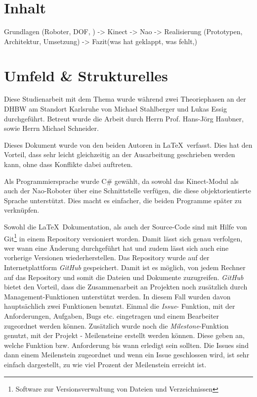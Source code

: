 \section{Inhalt}
Grundlagen (Roboter, DOF, ) -> Kinect -> Nao -> Realisierung (Prototypen, Architektur, Umsetzung) -> Fazit(was hat geklappt, was fehlt,)



\section{Umfeld \& Strukturelles}
Diese Studienarbeit mit dem Thema \textit{\Titel} wurde während zwei Theoriephasen an der \ac{DHBW} am Standort Karlsruhe von Michael Stahlberger und Lukas Essig durchgeführt. Betreut wurde die Arbeit durch Herrn Prof. Hans-Jörg Haubner, sowie Herrn Michael Schneider. 

Dieses Dokument wurde von den beiden Autoren in \LaTeX\ verfasst. Dies hat den Vorteil, dass sehr leicht gleichzeitig an der Ausarbeitung geschrieben werden kann, ohne dass Konflikte dabei auftreten. 

Als Programmiersprache wurde C\# gewählt, da sowohl das Kinect-Modul als auch der Nao-Roboter über eine Schnittstelle verfügen, die diese objektorientierte Sprache unterstützt. Dies macht es einfacher, die beiden Programme später zu verknüpfen.

Sowohl die \LaTeX\ Dokumentation, als auch der Source-Code sind mit Hilfe von Git\footnote{Software zur Versionsverwaltung von Dateien und Verzeichnissen}  in einem Repository versioniert worden. Damit lässt sich genau verfolgen, wer wann eine Änderung durchgeführt hat und zudem lässt sich auch eine vorherige Versionen wiederherstellen.
Das Repository wurde auf der Internetplattform \textit{GitHub}  gespeichert. Damit ist es möglich, von jedem Rechner auf das Repository und somit die Dateien und Dokumente zuzugreifen. \textit{GitHub} bietet den Vorteil, dass die Zusammenarbeit an Projekten noch zusätzlich durch Management-Funktionen unterstützt werden. In diesem Fall wurden davon hauptsächlich zwei Funktionen benutzt. Einmal die \textit{Issue}- Funktion, mit der Anforderungen, Aufgaben, Bugs etc. eingetragen und einem Bearbeiter zugeordnet werden können. Zusätzlich wurde noch die \textit{Milestone}-Funktion genutzt, mit der Projekt - Meilensteine erstellt werden können. Diese geben an, welche Funktion bzw. Anforderung bis wann erledigt sein sollten. Die Issues sind dann einem Meilenstein zugeordnet und wenn ein Issue geschlossen wird, ist sehr einfach dargestellt, zu wie viel Prozent der Meilenstein erreicht ist.
